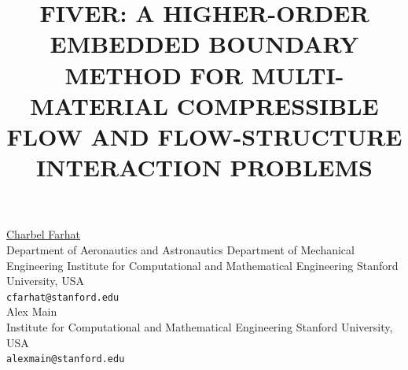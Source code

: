 \documentclass[article,A4,11pt]{llncs}%
\begin{document}
\title{FIVER: A HIGHER-ORDER EMBEDDED BOUNDARY METHOD FOR MULTI-MATERIAL COMPRESSIBLE FLOW AND FLOW-STRUCTURE INTERACTION PROBLEMS}
 \author{} \institute{}
\maketitle
\begin{center}
{\large \underline{Charbel Farhat}}\\
Department of Aeronautics and Astronautics Department of Mechanical Engineering Institute for Computational and Mathematical Engineering Stanford University, USA\\
{\tt cfarhat@stanford.edu}
\\ \vspace{4mm}
{\large Alex Main}\\
Institute for Computational and Mathematical Engineering Stanford University, USA\\
{\tt alexmain@stanford.edu}
\end{center}
\end{document}
